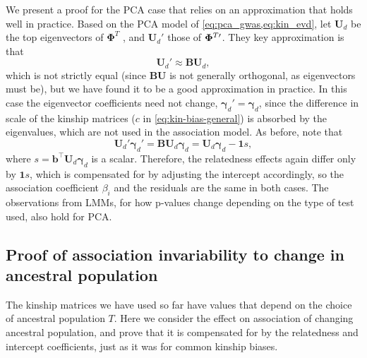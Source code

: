 \documentclass[11pt]{article}
\newcommand{\kinMat}[1][T]{%
  \ensuremath{%
    \mathbf{\Phi}^{#1}
  }%
  \xspace%
}%
\newcommand{\kinMatPrime}{%
  \ensuremath{%
    \mathbf{\Phi}^{T\prime}
  }%
  \xspace%
}%
\begin{document}
We present a proof for the PCA case that relies on an approximation that holds well in practice.
Based on the PCA model of \cref{eq:pca_gwas,eq:kin_evd}, let $\mathbf{U}_d$ be the top eigenvectors of \kinMat, and $\mathbf{U}_d'$ those of $\kinMatPrime$.
They key approximation is that
$$
\mathbf{U}_d' \approx \mathbf{B} \mathbf{U}_d,
$$
which is not strictly equal (since $\mathbf{B} \mathbf{U}$ is not generally orthogonal, as eigenvectors must be), but we have found it to be a good approximation in practice.
In this case the eigenvector coefficients need not change, $\boldsymbol{\gamma}_d' = \boldsymbol{\gamma}_d$, since the difference in scale of the kinship matrices ($c$ in \cref{eq:kin-bias-general}) is absorbed by the eigenvalues, which are not used in the association model.
As before, note that
$$
\mathbf{U}_d' \boldsymbol{\gamma}_d'
=
\mathbf{B} \mathbf{U}_d \boldsymbol{\gamma}_d
=
\mathbf{U}_d \boldsymbol{\gamma}_d - \mathbf{1} s,
$$
where
$s = \mathbf{b}^\intercal \mathbf{U}_d \boldsymbol{\gamma}_d$
is a scalar.
Therefore, the relatedness effects again differ only by $\mathbf{1} s$, which is compensated for by adjusting the intercept accordingly, so the association coefficient $\beta_i$ and the residuals are the same in both cases.
The observations from LMMs, for how p-values change depending on the type of test used, also hold for PCA.

\subsection{Proof of association invariability to change in ancestral population}

The kinship matrices we have used so far have values that depend on the choice of ancestral population $T$.
Here we consider the effect on association of changing ancestral population, and prove that it is compensated for by the relatedness and intercept coefficients, just as it was for common kinship biases.
\end{document}
